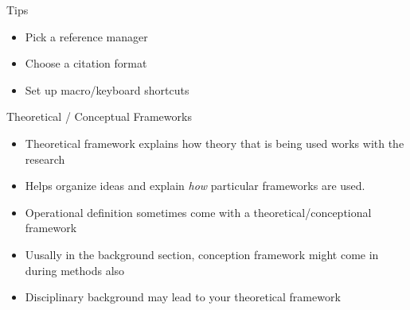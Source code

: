 \documentclass{TC}
\begin{document}
Tips
	\begin{itemize}
	\item Pick a reference manager
	\item Choose a citation format
	\item Set up macro/keyboard shortcuts
	\end{itemize}
Theoretical / Conceptual Frameworks
	\begin{itemize}
	\item Theoretical framework explains how theory that is being used works with the research
	\item Helps organize ideas and explain \emph{how} particular frameworks are used.
	\item Operational definition sometimes come with a theoretical/conceptional framework
	\item Uusally in the background section, conception framework might come in during methods also
	\item Disciplinary background may lead to your theoretical framework
	\end{itemize}	
\end{document}

